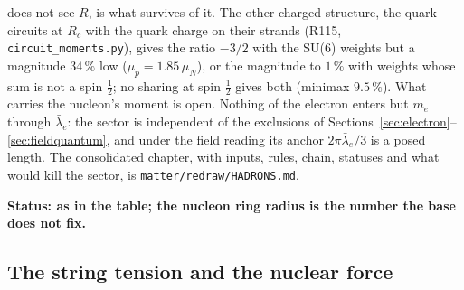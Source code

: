\documentclass[11pt,a4paper]{article}
\theoremstyle{plain}
\theoremstyle{remark}
\newcommand{\lb}{\ensuremath{\bar\lambda_e}}
\newcommand{\status}[1]{\medskip\noindent\textbf{Status: #1.}\ }
\begin{document}
does not see $R$, is what survives of it. The other charged structure, the quark circuits at $R_c$
with the quark charge on their strands (R115, \texttt{circuit\_moments.py}), gives the ratio
$-3/2$ with the SU(6) weights but a magnitude $34\,\%$ low ($\mu_p = 1.85\,\mu_N$), or the
magnitude to $1\,\%$ with weights whose sum is not a spin $\tfrac12$; no sharing at spin $\tfrac12$
gives both (minimax $9.5\,\%$). What carries the nucleon's moment is open. Nothing of the electron
enters but $m_e$ through $\lb$: the sector is independent of the exclusions of
Sections~\ref{sec:electron}--\ref{sec:fieldquantum}, and under the field reading its anchor
$2\pi\lb/3$ is a posed length. The consolidated chapter, with inputs, rules, chain, statuses and
what would kill the sector, is \texttt{matter/redraw/HADRONS.md}.

\status{as in the table; the nucleon ring radius is the number the base does not fix}

\subsection{The string tension and the nuclear force}\label{sec:tension}
\end{document}
